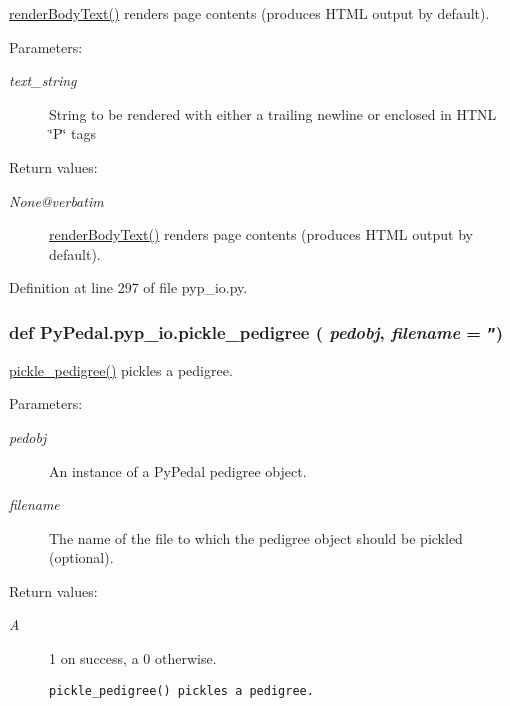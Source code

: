 \hyperlink{namespacePyPedal_1_1pyp__io_23579dde930ef86ed159126ab4068a46}{render\-Body\-Text()} renders page contents (produces HTML output by default). 

\begin{Desc}
\item[Parameters:]
\begin{description}
\item[{\em text\_\-string}]String to be rendered with either a trailing newline or enclosed in HTNL \char`\"{}P\char`\"{} tags \end{description}
\end{Desc}
\begin{Desc}
\item[Return values:]
\begin{description}
\item[{\em None@verbatim}]\hyperlink{namespacePyPedal_1_1pyp__io_23579dde930ef86ed159126ab4068a46}{render\-Body\-Text()} renders page contents (produces HTML output by default).  \end{description}
\end{Desc}


Definition at line 297 of file pyp\_\-io.py.\hypertarget{namespacePyPedal_1_1pyp__io_545a32bfae51807f04ee7138037b1ab8}{
\subsubsection[pickle\_\-pedigree]{\setlength{\rightskip}{0pt plus 5cm}def Py\-Pedal.pyp\_\-io.pickle\_\-pedigree ( {\em pedobj},  {\em filename} = {\tt ''})}}
\label{namespacePyPedal_1_1pyp__io_545a32bfae51807f04ee7138037b1ab8}


\hyperlink{namespacePyPedal_1_1pyp__io_545a32bfae51807f04ee7138037b1ab8}{pickle\_\-pedigree()} pickles a pedigree. 

\begin{Desc}
\item[Parameters:]
\begin{description}
\item[{\em pedobj}]An instance of a Py\-Pedal pedigree object. \item[{\em filename}]The name of the file to which the pedigree object should be pickled (optional). \end{description}
\end{Desc}
\begin{Desc}
\item[Return values:]
\begin{description}
\item[{\em A}]1 on success, a 0 otherwise.

\footnotesize\begin{verbatim}pickle_pedigree() pickles a pedigree.
\end{verbatim}
\normalsize
 \end{description}
\end{Desc}


